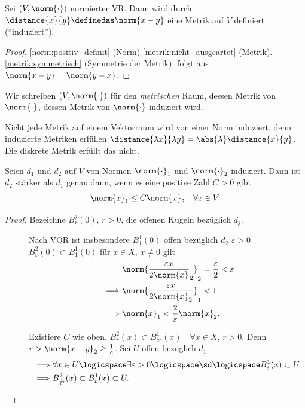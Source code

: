 \begin{lemma}
    Sei \( (V,\norm{\cdot}) \) normierter VR\@. Dann wird durch \( \distance{x}{y}\definedas \norm{x-y} \) eine Metrik auf \( V \) definiert (\enquote{induziert}).
\end{lemma}
\begin{proof}
    \ref{norm:positiv_definit} (Norm) \timplies \ref{metrik:nicht_ausgeartet} (Metrik). \ref{metrik:symmetrisch} (Symmetrie der Metrik): folgt aus \( \norm{x-y}=\norm{y-x} \).
\end{proof}
\begin{notation*}
    Wir schreiben \( (V,\norm{\cdot}) \) für den \emph{metrischen} Raum, dessen Metrik von \( \norm{\cdot} \), dessen Metrik von \( \norm{\cdot} \) induziert wird.
\end{notation*}
\begin{bemerkung*}
    Nicht jede Metrik auf einem Vektorraum wird von einer Norm induziert, denn induzierte Metriken erfüllen \( \distance{\lambda x}{\lambda y}=\abs{\lambda}\distance{x}{y} \). Die diskrete Metrik erfüllt das nicht.
\end{bemerkung*}
\begin{lemma}\label{normen_staerke_abschaetzung}
    Seien \( d_1 \) und \( d_2 \) auf \( V \) von Normen \( \norm{\cdot}_1 \) und \( \norm{\cdot}_2 \) induziert. Dann ist \( d_2 \) stärker als \( d_1 \) genau dann, wenn es eine positive Zahl \( C>0 \) gibt \sd
    \begin{align*}
        \norm{x}_1\leq C\norm{x}_2\quad \forall x\in V.
    \end{align*}
\end{lemma}
\begin{proof}
    Bezeichne \( B_{r}^j(0) \), \( r>0 \), die offenen Kugeln bezüglich \( d_j \).
    \begin{description}
        \item[\hin] Nach VOR ist insbesondere \( B_1^1(0) \) offen bezüglich \( d_2 \) \timplies \texists \( \varepsilon>0 \) \sd \( B_\varepsilon^2(0)\subset B_1^1(0) \) \timplies für \( x\in X \), \( x\neq 0 \) gilt
        \begin{align*}
            &\norm{\frac{\varepsilon x}{2\norm{x}}_2}_2=\frac{\varepsilon}{2}<\varepsilon\\\
            \implies &\norm{\frac{\varepsilon x}{2\norm{x}_2}}_1 <1 \\
            \implies &\norm{x}_1<\frac{2}{\varepsilon}\norm{x}_2.
        \end{align*} 
        \item[\rueck] Existiere \( C \) wie oben. \( B_r^2(x)\subset B_{cr}^1(x)\quad \forall x\in X \), \( r>0 \). Denn \( r>\norm{x-y}_2\geq \frac{1}{c} \). Sei \( U \) offen bezüglich \( d_1 \)
        \begin{align*}
            \implies &\forall x\in U\logicspace \exists \varepsilon>0\logicspace\text{\sd} \logicspace B_{\varepsilon}^1(x)\subset U\\
            \implies &B_{\frac{\varepsilon}{C}}^2(x)\subset B_{\varepsilon}^1(x)\subset U.
        \end{align*} 
    \end{description}
    
\end{proof}
